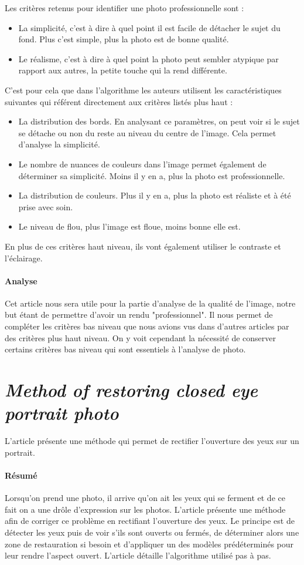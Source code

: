 \documentclass[11pt, french]{report-rd-info}
\begin{document}
Les critères retenus pour identifier une photo professionnelle sont :
\begin{itemize}
\item La simplicité, c'est à dire à quel point il est facile de détacher le sujet du fond. Plus c'est simple, plus la photo est de bonne qualité.
\item Le réalisme, c'est à dire à quel point la photo peut sembler atypique par rapport aux autres, la petite touche qui la rend différente.
\end{itemize}
C'est pour cela que dans l'algorithme les auteurs utilisent les caractéristiques suivantes qui référent directement aux critères listés plus haut :
\begin{itemize}
\item La distribution des bords. En analysant ce paramètres, on peut voir si le sujet se détache ou non du reste au niveau du centre de l'image. Cela permet d'analyse la simplicité.
\item Le nombre de nuances de couleurs dans l'image permet également de déterminer sa simplicité. Moins il y en a, plus la photo est professionnelle.
\item La distribution de couleurs. Plus il y en a, plus la photo est réaliste et à été prise avec soin.
\item Le niveau de flou, plus l'image est floue, moins bonne elle est.
\end{itemize}
En plus de ces critères haut niveau, ils vont également utiliser le contraste et l'éclairage.

\paragraph{Analyse}
Cet article nous sera utile pour la partie d'analyse de la qualité de l'image, notre but étant de permettre d'avoir un rendu "professionnel". Il nous permet de compléter les critères bas niveau que nous avions vus dans d'autres articles par des critères plus haut niveau. On y voit cependant la nécessité de conserver certains critères bas niveau qui sont essentiels à l'analyse de photo.

\section{\emph{Method of restoring closed eye portrait photo}}
L'article \cite{Li2011} présente une méthode qui permet de rectifier l'ouverture des yeux sur un portrait.

\paragraph{Résumé}
Lorsqu'on prend une photo, il arrive qu'on ait les yeux qui se ferment et de ce fait on a une drôle d'expression sur les photos. L'article présente une méthode afin de corriger ce problème en rectifiant l'ouverture des yeux.
Le principe est de détecter les yeux puis de voir s'ils sont ouverts ou fermés, de déterminer alors une zone de restauration si besoin et d'appliquer un des modèles prédéterminés pour leur rendre l'aspect ouvert.
L'article détaille l'algorithme utilisé pas à pas.
\end{document}
